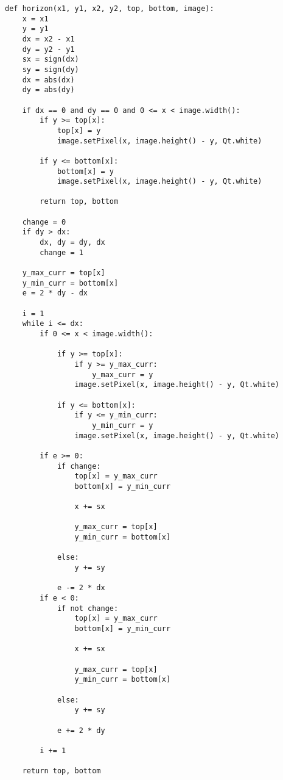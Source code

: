 \documentclass[oneside,final,14pt]{extreport}
\begin{document}
\begin{lstlisting}[caption = Функция \texttt{horizon} -- реализация алгоритма плавающего горизонта, label = sub:horizon]
def horizon(x1, y1, x2, y2, top, bottom, image):
    x = x1
    y = y1
    dx = x2 - x1
    dy = y2 - y1
    sx = sign(dx)
    sy = sign(dy)
    dx = abs(dx)
    dy = abs(dy)

    if dx == 0 and dy == 0 and 0 <= x < image.width():
        if y >= top[x]:
            top[x] = y
            image.setPixel(x, image.height() - y, Qt.white)

        if y <= bottom[x]:
            bottom[x] = y
            image.setPixel(x, image.height() - y, Qt.white)

        return top, bottom

    change = 0
    if dy > dx:
        dx, dy = dy, dx
        change = 1

    y_max_curr = top[x]
    y_min_curr = bottom[x]
    e = 2 * dy - dx

    i = 1
    while i <= dx:
        if 0 <= x < image.width():

            if y >= top[x]:
                if y >= y_max_curr:
                    y_max_curr = y
                image.setPixel(x, image.height() - y, Qt.white)

            if y <= bottom[x]:
                if y <= y_min_curr:
                    y_min_curr = y
                image.setPixel(x, image.height() - y, Qt.white)

        if e >= 0:
            if change:
                top[x] = y_max_curr
                bottom[x] = y_min_curr

                x += sx

                y_max_curr = top[x]
                y_min_curr = bottom[x]

            else:
                y += sy

            e -= 2 * dx
        if e < 0:
            if not change:
                top[x] = y_max_curr
                bottom[x] = y_min_curr

                x += sx

                y_max_curr = top[x]
                y_min_curr = bottom[x]

            else:
                y += sy

            e += 2 * dy

        i += 1

    return top, bottom
\end{lstlisting}
\end{document}
